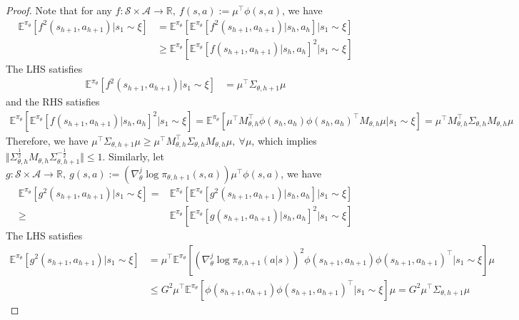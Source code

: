 \documentclass{article}
\numberwithin{equation}{section}
\begin{document}
\begin{proof}
Note that for any $f:\mathcal{S}\times\mathcal{A}\rightarrow \mathbb{R},\ f(s,a):=\mu^\top\phi(s, a)$, we have
\begin{align*}
    \mathbb{E}^{\pi_\theta}\left[f^2(s_{h+1},a_{h+1})\vert s_1\sim\xi\right]&=\mathbb{E}^{\pi_\theta}\left[\mathbb{E}^{\pi_\theta}\left[f^2(s_{h+1},a_{h+1})\vert s_h,a_h\right]\vert s_1\sim\xi\right]\\
    &\geq\mathbb{E}^{\pi_\theta}[\mathbb{E}^{\pi_\theta}[f(s_{h+1},a_{h+1})\vert s_h,a_h]^2\vert  s_1\sim\xi]
\end{align*}
The LHS satisfies
\begin{align*}
    \mathbb{E}^{\pi_\theta}[f^2(s_{h+1},a_{h+1})\vert s_1\sim \xi]&=\mu^\top\Sigma_{\theta, h+1}\mu
\end{align*}
and the RHS satisfies
\begin{align*}
    \mathbb{E}^{\pi_\theta}[\mathbb{E}^{\pi_\theta}[f(s_{h+1},a_{h+1})\vert s_h,a_h]^2\vert s_1\sim\xi]=\mathbb{E}^{\pi_\theta}[\mu^\top M_{\theta,h}^\top\phi(s_h,a_h)\phi(s_h,a_h)^\top M_{\theta,h}\mu\vert s_1\sim\xi]=\mu^\top M_{\theta,h}^\top\Sigma_{\theta,h} M_{\theta,h}\mu
\end{align*}
Therefore, we have $\mu^\top\Sigma_{\theta,h+1}\mu\geq\mu^\top M_{\theta,h}^\top\Sigma_{\theta,h} M_{\theta,h} \mu,\ \forall\mu$, which implies $\Vert\Sigma_{\theta,h}^{\frac{1}{2}}M_{\theta,h} \Sigma_{\theta,h+1}^{-\frac{1}{2}}\Vert\leq 1$. Similarly, let $g:\mathcal{S}\times\mathcal{A}\rightarrow\mathbb{R},\ g(s, a):=\left(\nabla_\theta^j\log\pi_{\theta, h+1}(s, a)\right)\mu^\top\phi(s,a)$, we have
\begin{align*}
    \mathbb{E}^{\pi_\theta}[g^2(s_{h+1},a_{h+1})\vert s_1\sim\xi]=&\mathbb{E}^{\pi_\theta}[\mathbb{E}^{\pi_\theta}[g^2(s_{h+1}, a_{h+1})\vert s_h,a_h]\vert s_1\sim\xi]\\
    \geq&\mathbb{E}^{\pi_\theta}[\mathbb{E}^{\pi_\theta}[g(s_{h+1},a_{h+1})\vert s_h,a_h]^2\vert s_1\sim\xi]
\end{align*}
The LHS satisfies
\begin{align*}
    \mathbb{E}^{\pi_\theta}[g^2(s_{h+1},a_{h+1})\vert s_1\sim\xi]&=\mu^\top\mathbb{E}^{\pi_\theta}\left[\left(\nabla_\theta^j\log\pi_{\theta,h+1}(a\vert s)\right)^2\phi(s_{h+1}, a_{h+1})\phi(s_{h+1},a_{h+1})^\top\vert s_1\sim\xi\right]\mu\\
    &\leq G^2\mu^\top\mathbb{E}^{\pi_\theta}\left[\phi(s_{h+1},a_{h+1})\phi(s_{h+1},a_{h+1})^\top\vert s_1\sim\xi\right]\mu=G^2\mu^\top\Sigma_{\theta,h+1}\mu

\end{align*}
\end{proof}
\end{document}
